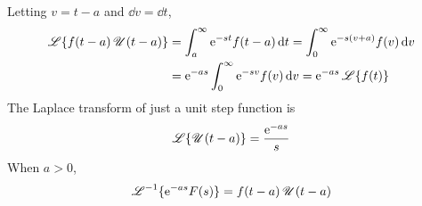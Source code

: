 \documentclass[./Differential Equations.tex]{subfiles}
\begin{document}
					Letting \(v = t - a\) and \(\dd{v} = \dd{t}\),
					\begin{align*}
						 \operatorname{\mathscr{L}}\{f(t - a)\operatorname{\mathscr{U}}(t - a)\} &= \int_a^\infty \text{e}^{-st}f(t - a) \dd{t}
						 		= \int_0^\infty \text{e}^{-s(v + a)}f(v)\dd{v} \\
						 	&= \text{e}^{-as}\int_0^\infty \text{e}^{-sv}f(v)\dd{v}
						 		= \text{e}^{-as}\operatorname{\mathscr{L}}\{f(t)\}
					\end{align*}
				The Laplace transform of just a unit step function is
					\[\operatorname{\mathscr{L}}\{\operatorname{\mathscr{U}}(t - a)\} = \frac{\text{e}^{-as}}{s}\]
				When \(a > 0\),
					\[\operatorname{\mathscr{L}}^{-1}\{\text{e}^{-as}F(s)\} = f(t - a)\operatorname{\mathscr{U}}(t - a)\]
				
\end{document}
